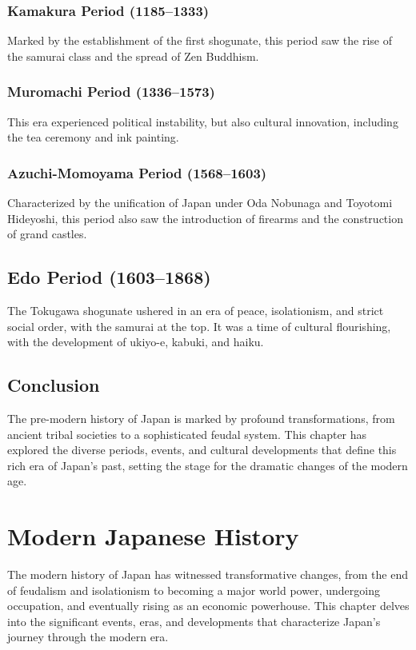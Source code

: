 \documentclass[a4paper,12pt]{book}
\begin{document}
\subsection{Kamakura Period (1185–1333)}
\label{subsec:kamakura-period}
Marked by the establishment of the first shogunate, this period saw the rise of the samurai class and the spread of Zen Buddhism.

\subsection{Muromachi Period (1336–1573)}
\label{subsec:muromachi-period}
This era experienced political instability, but also cultural innovation, including the tea ceremony and ink painting.

\subsection{Azuchi-Momoyama Period (1568–1603)}
\label{subsec:azuchi-momoyama-period}
Characterized by the unification of Japan under Oda Nobunaga and Toyotomi Hideyoshi, this period also saw the introduction of firearms and the construction of grand castles.

\section{Edo Period (1603–1868)}
\label{sec:edo-period}
The Tokugawa shogunate ushered in an era of peace, isolationism, and strict social order, with the samurai at the top. It was a time of cultural flourishing, with the development of ukiyo-e, kabuki, and haiku.

\section{Conclusion}
\label{sec:conclusion-pre-modern-japan}
The pre-modern history of Japan is marked by profound transformations, from ancient tribal societies to a sophisticated feudal system. This chapter has explored the diverse periods, events, and cultural developments that define this rich era of Japan’s past, setting the stage for the dramatic changes of the modern age.

\chapter{Modern Japanese History}
\label{ch:modern-japanese-history}

The modern history of Japan has witnessed transformative changes, from the end of feudalism and isolationism to becoming a major world power, undergoing occupation, and eventually rising as an economic powerhouse. This chapter delves into the significant events, eras, and developments that characterize Japan’s journey through the modern era.
\end{document}

